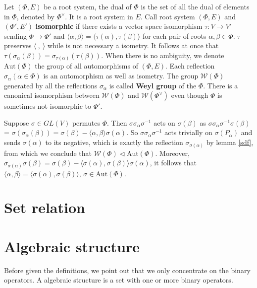 \documentclass{amsbook}
\theoremstyle{definition}
\theoremstyle{remark}
\newcommand{\W}{\mathcal{W}}
\newcommand{\Aut}{\mathrm{Aut}}
\newcommand{\cartan}[2]{\langle {#1}, {#2} \rangle}
\numberwithin{section}{chapter}
\numberwithin{equation}{chapter}
\begin{document}
Let $(\Phi, E)$ be a root system, the dual of $\Phi$ is the set of all the dual of elements in $\Phi$, denoted by $\Phi^\vee$. It is a root system in $E$. Call root system $(\Phi, E)$ and $(\Phi', E')$ \textbf{isomorphic} if there exists a vector space isomorphism $\tau \colon V \to V'$ sending $\Phi \to \Phi'$ and  $\cartan{\alpha}{\beta} = \cartan{\tau(\alpha)}{\tau(\beta)}$ for each pair of roots $\alpha, \beta \in \Phi$. $\tau$ preserves $\langle \ ,\  \rangle$ while is not necessary a isometry. It follows at once that $\tau(\sigma_\alpha(\beta)) = \sigma_{\tau(\alpha)}(\tau(\beta))$. When there is no ambiguity, we denote $\Aut(\Phi)$ the group of all automorphisms of $(\Phi, E)$. Each reflection $\sigma_\alpha(\alpha\in\Phi)$ is an automorphism as well as isometry. The group $\W(\Phi)$ generated by all the reflections $\sigma_\alpha$ is called \textbf{Weyl group} of the $\Phi$. There is a canonical isomorphism between $\W(\Phi)$ and $\W(\Phi^\vee)$ even though $\Phi$ is sometimes not isomorphic to $\Phi'$.

Suppose $\sigma \in GL(V)$ permutes $\Phi$. Then $\sigma \sigma_\alpha \sigma^{-1}$ acts on $\sigma(\beta)$ as $\sigma \sigma_\alpha \sigma^{-1} \sigma(\beta)$ = $\sigma(\sigma_\alpha(\beta)) = \sigma(\beta) - \cartan{\alpha}{\beta}\sigma(\alpha)$. So $\sigma \sigma_\alpha \sigma^{-1}$ acts trivially on $\sigma(P_\alpha)$ and sends $\sigma(\alpha)$ to its negative, which is exactly the reflection $\sigma_{\sigma(\alpha)}$ by lemma \ref{sdf}, from which we conclude that $\W(\Phi) \triangleleft \Aut(\Phi)$. Moreover, $\sigma_{\sigma(\alpha)} \sigma(\beta)= \sigma(\beta) - \cartan{\sigma(\alpha)}{\sigma(\beta)}\sigma(\alpha)$, it follows that $\cartan{\alpha}{\beta} = \cartan{\sigma(\alpha)}{\sigma(\beta)}$, $\sigma\in\Aut(\Phi)$.


\appendix
\chapter{Set relation}
\chapter{Algebraic structure}
Before given the definitions, we point out that we only concentrate on the binary operators. 
A algebraic structure is a set with one or more binary operators.




\backmatter


\printindex
\end{document}
